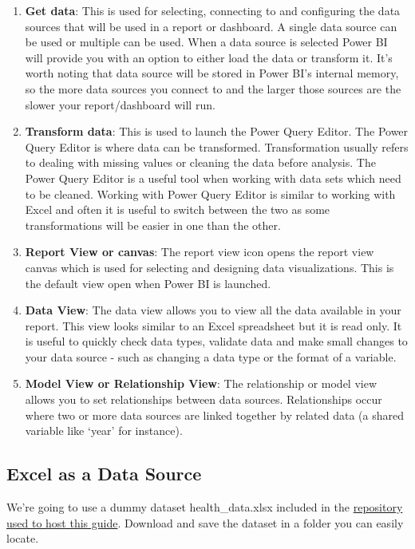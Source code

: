 \documentclass[
]{book}
\begin{document}
\begin{enumerate}
\def\labelenumi{\arabic{enumi}.}
\item
  \textbf{Get data}: This is used for selecting, connecting to and configuring the data sources that will be used in a report or dashboard. A single data source can be used or multiple can be used. When a data source is selected Power BI will provide you with an option to either load the data or transform it. It's worth noting that data source will be stored in Power BI's internal memory, so the more data sources you connect to and the larger those sources are the slower your report/dashboard will run.
\item
  \textbf{Transform data}: This is used to launch the Power Query Editor. The Power Query Editor is where data can be transformed. Transformation usually refers to dealing with missing values or cleaning the data before analysis. The Power Query Editor is a useful tool when working with data sets which need to be cleaned. Working with Power Query Editor is similar to working with Excel and often it is useful to switch between the two as some transformations will be easier in one than the other.
\item
  \textbf{Report View or canvas}: The report view icon opens the report view canvas which is used for selecting and designing data visualizations. This is the default view open when Power BI is launched.
\item
  \textbf{Data View}: The data view allows you to view all the data available in your report. This view looks similar to an Excel spreadsheet but it is read only. It is useful to quickly check data types, validate data and make small changes to your data source - such as changing a data type or the format of a variable.
\item
  \textbf{Model View or Relationship View}: The relationship or model view allows you to set relationships between data sources. Relationships occur where two or more data sources are linked together by related data (a shared variable like `year' for instance).
\end{enumerate}

\hypertarget{excel-as-a-data-source}{%
\subsection{Excel as a Data Source}\label{excel-as-a-data-source}}

We're going to use a dummy dataset health\_data.xlsx included in the \href{https://github.com/aamcmurray/BookTest/blob/main/health_data.xlsx}{repository used to host this guide}. Download and save the dataset in a folder you can easily locate.
\end{document}
